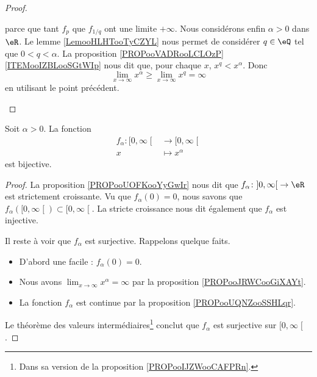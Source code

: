 \begin{proof}
\begin{subproof}
\begin{equation}
		\end{equation}
		parce que tant \( f_p\) que \( f_{1/q}\) ont une limite \( +\infty\).
		Nous considérons enfin \( \alpha>0\) dans \( \eR\). Le lemme \ref{LemooHLHTooTyCZYL} nous permet de considérer \( q\in \eQ\) tel que \( 0<q<\alpha\). La proposition \ref{PROPooVADRooLCLOzP}\ref{ITEMooIZBLooSGtWIp} nous dit que, pour chaque \( x\), \( x^q<x^{\alpha}\). Donc
		\begin{equation}
			\lim_{x\to \infty} x^{\alpha}\geq \lim_{x\to \infty} x^q=\infty
		\end{equation}
		en utilisant le point précédent.
	\end{subproof}
\end{proof}

\begin{proposition}     \label{PROPooEXGKooCqzLor}
	Soit \( \alpha>0\). La fonction
	\begin{equation}
		\begin{aligned}
			f_{\alpha}\colon \mathopen[ 0 , \infty \mathclose[ & \to \mathopen[ 0 , \infty \mathclose[ \\
			x                                                  & \mapsto x^{\alpha}
		\end{aligned}
	\end{equation}
	est bijective.
\end{proposition}

\begin{proof}
	La proposition \ref{PROPooUOFKooYyGwIr} nous dit que \( f_{\alpha}\colon \mathopen] 0 , \infty \mathclose[\to \eR\) est strictement croissante. Vu que  \( f_{\alpha}(0)=0\), nous savons que \( f_{\alpha}(\mathopen[ 0 , \infty \mathclose[)\subset\mathopen[ 0 , \infty \mathclose[\). La stricte croissance nous dit également que \( f_{\alpha}\) est injective.

	Il reste à voir que \( f_{\alpha}\) est surjective. Rappelons quelque faits.
	\begin{itemize}
		\item D'abord une facile :     \( f_{\alpha}(0)=0\).
		\item
		      Nous avons \( \lim_{x\to \infty} x^{\alpha}=\infty\) par la proposition \ref{PROPooJRWCooGiXAYt}.
		\item
		      La fonction \( f_{\alpha}\) est continue par la proposition \ref{PROPooUQNZooSSHLqr}.
	\end{itemize}
	Le théorème des valeurs intermédiaires\footnote{Dans sa version de la proposition \ref{PROPooIJZWooCAFPRn}.} conclut que \( f_{\alpha}\) est surjective sur \( \mathopen[ 0 , \infty \mathclose[\).
\end{proof}

